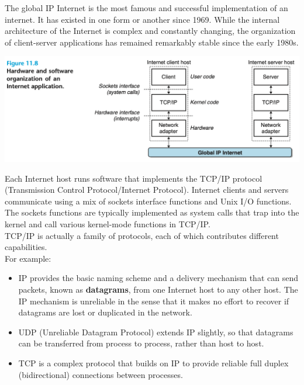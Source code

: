 \documentclass[11pt]{article}
\begin{document}
The global IP Internet is the most famous and successful implementation of an internet. It has existed in one form or another since 1969. While the internal architecture of the Internet is complex and constantly changing, the organization of client-server applications has remained remarkably stable since the early 1980s.\\

\begin{center}
\includegraphics[width=.9\linewidth]{pics/figure11.8-hardware-and-software-organization-of-an-internet-application.png}
\end{center}


Each Internet host runs software that implements the TCP/IP protocol (Transmission Control Protocol/Internet Protocol). Internet clients and servers communicate using a mix of sockets interface functions and Unix I/O functions. The sockets functions are typically implemented as system calls that trap into the kernel and call various kernel-mode functions in TCP/IP.\\

TCP/IP is actually a family of protocols, each of which contributes different capabilities.\\
For example:\\
\begin{itemize}
\item IP provides the basic naming scheme and a delivery mechanism that can send packets, known as \textbf{datagrams}, from one Internet host to any other host. The IP mechanism is unreliable in the sense that it makes no effort to recover if datagrams are lost or duplicated in the network.\\
\item UDP (Unreliable Datagram Protocol) extends IP slightly, so that datagrams can be transferred from process to process, rather than host to host.\\
\item TCP is a complex protocol that builds on IP to provide reliable full duplex (bidirectional) connections between processes.\\
\end{itemize}
\end{document}
